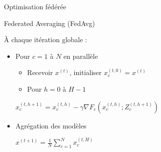 \documentclass[aspectratio=169,12pt]{beamer}
\begin{document}
\begin{frame}[t]{Optimisation fédérée ~~~  ~~}  
    
    \vspace{-1em}

  \begin{minipage}{0.5\linewidth}
  Federated Averaging (FedAvg)

\vspace{0.5em}
    

  \footnotesize
  À chaque itération globale :

    \begin{itemize}[leftmargin=*,itemsep=0em]
  \footnotesize
    \item Pour $c=1$ à $N$ en parallèle

\vspace{-0.2em}
    
    
\begin{itemize}[leftmargin=*,itemsep=0em]
\item Recevoir $x^{(t)}$, initialiser $x^{(t,0)}_c = x^{(t)}$
    
        \item Pour $h=0$ à $H-1$
    \end{itemize}

\vspace{-0.6em}
\begin{center}
            \hspace{-1em}$x^{(t,h+1)}_c = x^{(t,h)}_c - \gamma \nabla F_c( x^{(t,h)}_c ; Z_c^{(t,h+1)})$
        \end{center}
      
  \item Agrégation des modèles
        
        
\vspace{-0.6em}
\begin{center}
            \hspace{-1em}$x^{(t+1)} = \frac{1}{N} \sum_{c=1}^N x_c^{(t,H)}$
        \end{center}
      
    \end{itemize}
      

\end{minipage}
\end{frame}
\end{document}
